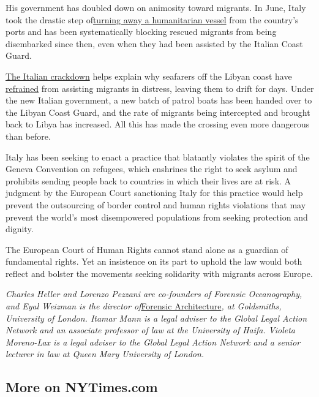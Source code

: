 His government has doubled down on animosity toward migrants. In June,
Italy took the drastic step
of\href{https://www.nytimes.com/2018/06/11/world/europe/italy-migrant-boat-aquarius.html}{}\href{https://www.nytimes.com/2018/06/11/world/europe/italy-migrant-boat-aquarius.html}{turning
away a humanitarian vessel} from the country's ports and has been
systematically blocking rescued migrants from being disembarked since
then, even when they had been assisted by the Italian Coast Guard.

\href{https://www.amnesty.org/download/Documents/EUR3089062018ENGLISH.pdf}{The
Italian crackdown} helps explain why seafarers off the Libyan coast have
\href{https://www.theguardian.com/world/2018/nov/09/us-navy-ship-ignored-sinking-migrants-cries-for-help-say-survivors}{refrained}
from assisting migrants in distress, leaving them to drift for days.
Under the new Italian government, a new batch of patrol boats has been
handed over to the Libyan Coast Guard, and the rate of migrants being
intercepted and brought back to Libya has increased. All this has made
the crossing even more dangerous than before.

Italy has been seeking to enact a practice that blatantly violates the
spirit of the Geneva Convention on refugees, which enshrines the right
to seek asylum and prohibits sending people back to countries in which
their lives are at risk. A judgment by the European Court sanctioning
Italy for this practice would help prevent the outsourcing of border
control and human rights violations that may prevent the world's most
disempowered populations from seeking protection and dignity.

The European Court of Human Rights cannot stand alone as a guardian of
fundamental rights. Yet an insistence on its part to uphold the law
would both reflect and bolster the movements seeking solidarity with
migrants across Europe.

\emph{Charles Heller and Lorenzo Pezzani are co-founders of Forensic
Oceanography, and Eyal Weizman is the director
of}\href{https://www.forensic-architecture.org/}{}\href{https://www.forensic-architecture.org/}{Forensic
Architecture}\emph{, at Goldsmiths, University of London. Itamar Mann is
a legal adviser to the Global Legal Action Network and an associate
professor of law at the University of Haifa. Violeta Moreno-Lax is a
legal adviser to the Global Legal Action Network and a senior lecturer
in law at Queen Mary University of London.}

\hypertarget{more-on-nytimescom}{%
\subsection{More on NYTimes.com}\label{more-on-nytimescom}}

